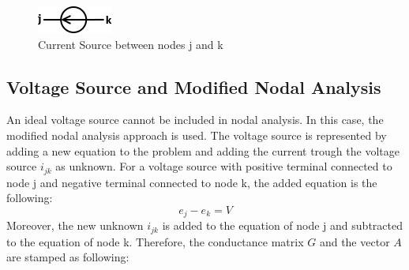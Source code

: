 \begin{figure}[h]
	\centering
	\includegraphics[scale=0.8]{img/CurrentSource.png}
	\caption{Current Source between nodes j and k}
	\label{fig:CurrentSource}
\end{figure}

\subsection{Voltage Source and Modified Nodal Analysis} \label{IdealVoltageSource}
An ideal voltage source cannot be included in nodal analysis. In this case, the modified nodal analysis approach is used. The voltage source is represented by adding a new equation to the problem and adding the current trough the voltage source $i_{jk}$ as unknown. 
For a voltage source with positive terminal connected to node j and negative terminal connected to node k, the added equation is the following:
\begin{equation}
e_j - e_k = V
\end{equation}
Moreover, the new unknown $i_{jk}$ is added to the equation of node j and subtracted to the equation of node k.
Therefore, the conductance matrix $G$ and the vector $A$ are stamped as following:

